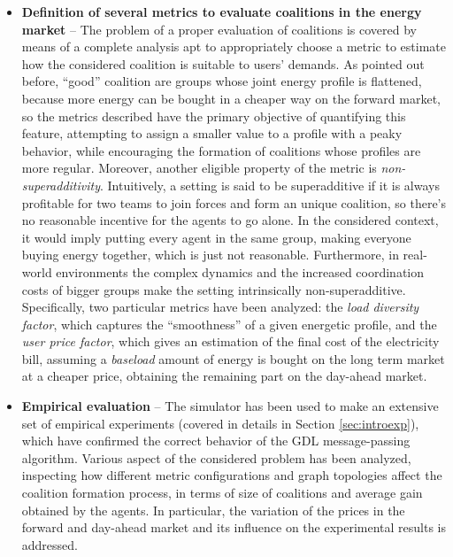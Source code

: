 \documentclass[11pt, twoside, titlepage, a4paper, openright]{report}
\begin{document}
\begin{itemize}
\item \textbf{Definition of several metrics to evaluate coalitions in the energy market} -- The problem of a proper evaluation of coalitions is covered by means of a complete analysis apt to appropriately choose a metric to estimate how the considered coalition is suitable to users' demands. As pointed out before, ``good'' coalition are groups whose joint energy profile is flattened, because more energy can be bought in a cheaper way on the forward market, so the metrics described have the primary objective of quantifying this feature, attempting to assign a smaller value to a profile with a peaky behavior, while encouraging the formation of coalitions whose profiles are more regular. Moreover, another eligible property of the metric is \textit{non-superadditivity}. Intuitively, a setting is said to be superadditive if it is always profitable for two teams to join forces and form an unique coalition, so there's no reasonable incentive for the agents to go alone. In the considered context, it would imply putting every agent in the same group, making everyone buying energy together, which is just not reasonable. 
\newpage
Furthermore, in real-world environments the complex dynamics and the increased coordination costs of bigger groups make the setting intrinsically non-superadditive. Specifically, two particular metrics have been analyzed: the \textit{load diversity factor}, which captures the ``smoothness'' of a given energetic profile, and the \textit{user price factor}, which gives an estimation of the final cost of the electricity bill, assuming a \textit{baseload} amount of energy is bought on the long term market at a cheaper price, obtaining the remaining part on the day-ahead market.
 
\item \textbf{Empirical evaluation} -- The simulator has been used to make an extensive set of empirical experiments (covered in details in Section \ref{sec:introexp}), which have confirmed the correct behavior of the GDL message-passing algorithm. Various aspect of the considered problem has been analyzed, inspecting how different metric configurations and graph topologies affect the coalition formation process, in terms of size of coalitions and average gain obtained by the agents. In particular, the variation of the prices in the forward and day-ahead market and its influence on the experimental results is addressed.

\end{itemize}
\end{document}
